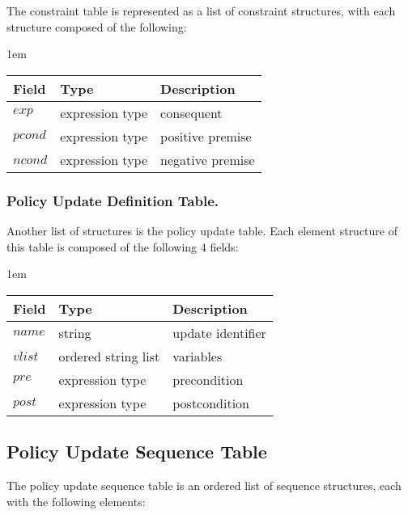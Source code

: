 \documentclass[global,twocolumn,draft]{svjour}
\newenvironment{vquote}
  {\begin{list}{}{\leftmargin 1em}\item[]}
  {\end{list}}
\begin{document}
        The constraint table is represented as a list of constraint
        structures, with each structure composed of the following:

        \begin{vquote}
          \begin{tabular}[t]{|l|l|l|}
            \hline
            \textbf{Field} & \textbf{Type} & \textbf{Description} \\
            \hline
            $exp$ & expression type & consequent \\
            \hline
            $pcond$ & expression type & positive premise \\
            \hline
            $ncond$ & expression type & negative premise \\
            \hline
          \end{tabular}
        \end{vquote}

      \subsubsection{Policy Update Definition Table.}

        Another list of structures is the policy update table. Each element
        structure of this table is composed of the following 4 fields:

        \begin{vquote}
          \begin{tabular}[t]{|l|l|l|}
            \hline
            \textbf{Field} & \textbf{Type} & \textbf{Description} \\
            \hline
            $name$ & string & update identifier \\
            \hline
            $vlist$ & ordered string list & variables \\
            \hline
            $pre$ & expression type & precondition \\
            \hline
            $post$ & expression type & postcondition \\
            \hline
          \end{tabular}
        \end{vquote}

    \subsection{Policy Update Sequence Table}

      The policy update sequence table is an ordered list of sequence
      structures, each with the following elements:
\end{document}
